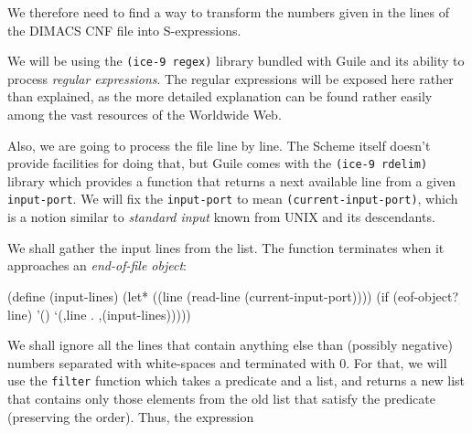 We therefore need to find a way to transform the numbers
given in the lines of the DIMACS CNF file into S-expressions.

We will be using the \texttt{(ice-9 regex)} library bundled 
with Guile and its ability to process \textit{regular expressions}.
The regular expressions will be exposed here rather than explained,
as the more detailed explanation can be found rather easily
among the vast resources of the Worldwide Web.

Also, we are going to process the file line by line. The
Scheme itself doesn't provide facilities for doing that,
but Guile comes with the \texttt{(ice-9 rdelim)} library
which provides a function that returns a next available line
from a given \texttt{input-port}. We will fix the
\texttt{input-port} to mean \texttt{(current-input-port)},
which is a notion similar to \textit{standard input} known
from UNIX and its descendants.

We shall gather the input lines from the list. The
function terminates when it approaches an \textit{end-of-file
object}:

\begin{Snippet}
(define (input-lines)
  (let* ((line (read-line (current-input-port))))
    (if (eof-object? line)
	'()
	`(,line . ,(input-lines)))))
\end{Snippet}

We shall ignore all the lines that contain anything else
than (possibly negative) numbers separated with white-spaces
and terminated with 0. For that, we will use the \texttt{filter}
function which takes a predicate and a list, and returns
a new list that contains only those elements from the old
list that satisfy the predicate (preserving the order).
Thus, the expression


